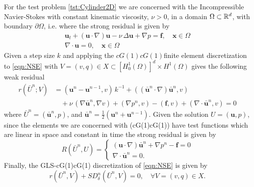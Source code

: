 For the test problem \ref{tst:Cylinder2D} we are concerned with the
Incompressible Navier-Stokes with constant kinematic viscosity, $\nu>0$, in a
domain $\Omega\subset \mathbb{R}^d$, with boundary $\partial \Omega$, i.e.  where the
strong residual is given by
\begin{equation}
    \begin{split}
      \mathbf{u}_t + \left( \mathbf{u} \cdot \nabla \right) \mathbf{u} - \nu\,
          \Delta \mathbf{u} + \nabla p = \mathbf{f}, \quad \mathbf{x} \in \Omega \\
          \nabla \cdot \mathbf{u} = 0, \quad \mathbf{x} \in \Omega
    \end{split}
  \label{eqn:NSE}
\end{equation}
Given a step size $k$ and applying the $cG(1)cG(1)$finite element discretization
to \autoref{eqn:NSE} with $V = (v, q) \in X \subset [H^1_0(\Omega)]^d \times
H^1(\Omega)$ gives the following weak residual
\begin{equation}
  \begin{split}
    r(\bar{U}^n; V) &= \left(\mathbf{u}^n - \mathbf{u}^{n-1}, v\right)\,k^{-1}
        + (\left( \bar{\mathbf{u}}^n \cdot \nabla \right) \bar{\mathbf{u}}^n, v) \\
        &\quad+ \nu\, (\nabla \bar{\mathbf{u}}^n, \nabla v)
        + (\nabla p^n, v) - (\mathbf{f}, v)
        + (\nabla \cdot \bar{\mathbf{u}}^n, v) = 0
  \end{split}
  \label{eqn:WeakNSE}
\end{equation}
where $\bar{U}^n = (\bar{\mathbf{u}}^n,p)$, and $\bar{\mathbf{u}}^n =
\frac{1}{2}\left(\mathbf{u}^n + \mathbf{u}^{n-1}\right)$. Given the solution
$U=(\mathbf{u},p)$, since the elements we are concerned with (cG(1)cG(1)) have
test functions which are linear in space and constant in time the strong
residual is given by
\begin{equation}
    R(\bar{U}^n,U) = \begin{cases}
      \left(\mathbf{u} \cdot \nabla \right) \bar{\mathbf{u}}^n
        + \nabla p^n - \mathbf{f} = 0 \\
      \nabla \cdot \bar{\mathbf{u}}^n = 0.
    \end{cases}
  \label{eqn:StrongNSE}
\end{equation}
Finally, the GLS-cG(1)cG(1) discretization of \eqref{eqn:NSE} is given by
\begin{equation}
  r(\bar{U}^n,V) + SD_{\delta}^n(\bar{U}^n,V) = 0, \quad \forall V=(v,q) \in X.
  \label{eqn:G2}
\end{equation}
